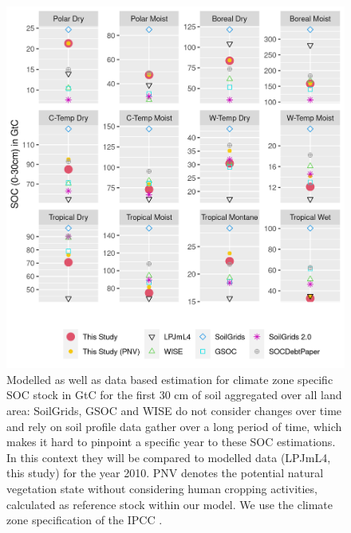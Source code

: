 \documentclass[gc, manuscript]{copernicus}
\begin{document}
\begin{figure}[!hp]
\includegraphics[width=13cm]{../ResultNotebooks/Output/Images/reg_comparisonfigure.png} 
\caption{Modelled as well as data based estimation for climate zone specific SOC stock in GtC for the first 30 cm of soil aggregated over all land area: SoilGrids, GSOC and WISE do not consider changes over time and rely on soil profile data gather over a long period of time, which makes it hard to pinpoint a specific year to these SOC estimations. In this context they will be compared to modelled data (LPJmL4, this study) for the year 2010. PNV denotes the potential natural vegetation state without considering human cropping activities, calculated as reference stock within our model. We use the climate zone specification of the IPCC \citep{eggleston_ipcc_2006}.}
\label{fig:SOCreg}
\end{figure}

\newpage
\end{document}
